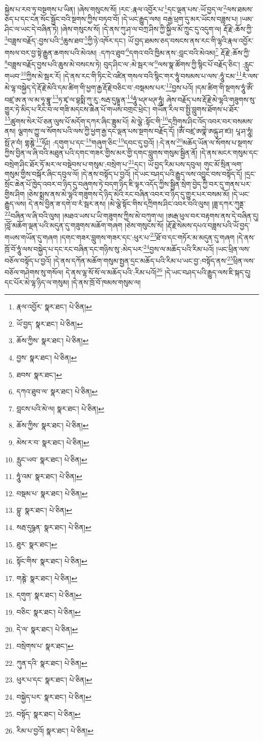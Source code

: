 སྐྱེས་པ་རབ་ཏུ་བསྔགས་པ་ཡིན། །ཞེས་གསུངས་སོ། །རང་:རྣལ་འབྱོར་པ་\footnote{རྣལ་འབྱོར་  སྣར་ཐང་།  པེ་ཅིན། }དང་ལྡན་པས་:ཡོ་བྱད་ལ་\footnote{ཡོ་བྱད་  སྣར་ཐང་།  པེ་ཅིན། }ལས་ཐམས་ཅད་པ་དང་ངན་སོང་སྦྱོང་བའི་སྔགས་ཀྱིས་བཏབ་བོ། །དེ་ཡང་རྒྱུད་ལས། བརྒྱ་ཕྲག་དུ་མར་ཡོངས་བཟླས་པ། །ཡམ་ཤིང་ལ་ཡང་དེ་བཞིན་ཏེ། །ཞེས་གསུངས་སོ། །དེ་ནས་ཀུ་ཤ་ལ་བཀྲ་ཤིས་ཀྱི་སྐྱིལ་མོ་ཀྲུང་དུ་འདུག་ལ། རྡོ་རྗེ་:ཆོས་ཀྱི་\footnote{ཆོས་ཀྱིས་  སྣར་ཐང་།  པེ་ཅིན། }བཟླས་བརྗོད་:བྱས་པའི་\footnote{བྱས་  སྣར་ཐང་།  པེ་ཅིན། }ཆུས་ཐབ་\footnote{ཐབས་  སྣར་ཐང་། }ཀྱི་ཉེ་འཁོར་དང་། ཡོ་བྱད་ཐམས་ཅད་བསངས་ནས་རང་གི་ལྷའི་རྣལ་འབྱོར་གསལ་བར་བྱ་སྟེ་རྒྱུན་ཆགས་པའི་མེའམ། :དཀའ་ཐུབ་\footnote{དཀའ་ཐུབ་ལ་  སྣར་ཐང་།  པེ་ཅིན། }དགའ་བའི་ཁྱིམ་ནས་:བླང་བའི་མེའམ།\footnote{བླངས་པའི་མེ་ལ།  སྣར་ཐང་།  པེ་ཅིན། } རྡོ་རྗེ་:ཆོས་ཀྱི་\footnote{ཆོས་ཀྱིས་  སྣར་ཐང་།  པེ་ཅིན། }བཟླས་བརྗོད་བྱས་པའི་ཆུས་མེ་བསངས་ཏེ། བུད་ཤིང་ལ་:མེ་སྦར་ལ་\footnote{མེས་ར་བ་  སྣར་ཐང་།  པེ་ཅིན། }ལས་སྣ་ཚོགས་ཀྱི་སྙིང་པོ་བརྗོད་ཅིང་། :རླུང་གཡབ་\footnote{རླུང་ཡབ་  སྣར་ཐང་།  པེ་ཅིན། }ཀྱིས་མེ་སྦར་རོ། །དེ་ནས་རང་གི་ཏིང་ངེ་འཛིན་གསལ་བའི་སྙིང་གར་ཧཱུཾ་བསམས་པ་ལས་:ཧཱུཾ་ངམ་\footnote{ཧཱུཾ་འམ་  སྣར་ཐང་།  པེ་ཅིན། }རཾ་ལས་མེ་ལྷ་བསྐྱེད་དེ་རྡོ་རྗེ་མེའི་དམ་ཚིག་གི་ཕྱག་རྒྱ་རྡོ་རྗེ་བཅིང་བ་:བསྡམས་པར་\footnote{བསྡམ་པ་  སྣར་ཐང་།  པེ་ཅིན། }བྱས་པའོ། །དམ་ཚིག་གི་སྔགས་ཧཱུཾ་ཨོཾ་བཛྲ་ཨ་ན་ལ་མ་ཧཱ་བྷཱུ་\footnote{བྷུ་  སྣར་ཐང་།  པེ་ཅིན། }ཏ་ཛྭ་ལ་བྷསྨི་ཀུ་རུ་:སརྦ་དུཥྚཱ་ན་\footnote{སརྦ་དུཥྚན་  སྣར་ཐང་།  པེ་ཅིན། }ཧཱུཾ་ཕཊ་ཕཊ་ཧཱུཾ། ཞེས་བརྗོད་པས་རྡོ་རྗེ་མེ་ལྷའི་གཟུགས་སུ་གྱུར་ཏེ་མིད་པ་རིང་བ་ལ་གཟི་མདངས་ཆེན་པོ་གཡས་བགྲང་ཕྲེང་། གཡོན་རིལ་བ་སྤྱི་བླུགས་ཐོགས་པ་ཐོར་\footnote{ཐུར་  སྣར་ཐང་། }ཚུགས་སེར་པོ་ཅན་ལུས་པོ་མདོག་དཀར་ཞིང་ཟླུམ་པོ། མེ་ལྕེ་:སྟོང་གི་\footnote{སྟོང་གིས་  སྣར་ཐང་།  པེ་ཅིན། }དཀྲིགས་ཤིང་འོད་འབར་བར་བསམས་ནས། ལྕགས་ཀྱུ་ལ་སོགས་པའི་ལས་ཀྱི་ཕྱག་རྒྱ་དང་ལྡན་པས་སྔགས་བརྗོད་དོ། །ཨོཾ་བཛྲ་ཨགྣེ་ཨངྐུ་ཤ་ཛཿ། པཱ་ཤ་ཧཱུཾ། སྥོ་ཊ་བཾ། གྷཎྚེ་\footnote{གཎྚེ་  སྣར་ཐང་།  པེ་ཅིན། }ཧོཿ། :དགུག་པ་དང་\footnote{དགུག་  སྣར་ཐང་།  པེ་ཅིན། }གཞུག་ཅིང་\footnote{བཅིང་  སྣར་ཐང་།  པེ་ཅིན། }དབང་དུ་བྱའོ། །:དེ་ནས་\footnote{དེ་ལ་  སྣར་ཐང་།  པེ་ཅིན། }མཆོད་ཡོན་ལ་སོགས་པ་སྔགས་ཀྱིས་བྱིན་ལ་ཞི་བའི་མཐུན་པའི་དགང་གཟར་གྱིས་མར་གྱི་དགང་བླུགས་གསུམ་སྦྱིན་ནོ། །དེ་ནས་མངར་གསུམ་དང་བསྲེག་ཤིང་ཐོར་ཏོ་མར་ལ་བསྡེབས་པ་གསུམ་:བསྲེག་པ་\footnote{བསྲེགས་པ་  སྣར་ཐང་། }དང་། ཡོ་བྱད་རིམ་པས་དབུལ། གུང་མོ་སྲིན་ལག་གསུམ་གྱིས་བསྐོར་ཞིང་དབུལ་ལོ། །དེ་ནས་བསྟོད་པ་བྱའོ། །དེ་ཡང་བཤད་པའི་རྒྱུད་ལས་འབྱུང་བས་བསྟོད་དོ། །དྲང་སྲོང་ཆེན་པོ་ཁྱེད་འབར་བ་ཉིད་དུ་བཞུགས་ཏེ་བདག་ཉིད་ཇི་ལྟར་འདོད་ཀྱིས་སྦྱིན་སྲེག་བྱེད་ཀྱི་བར་དུ་གནས་པར་གྱིས་ཤིག །ཅེས་སྨྲས་ནས་མེ་ལྷའི་གཟུགས་དེ་ཉིད་མེའི་རང་བཞིན་འབར་བ་ཉིད་དུ་གྱུར་པར་བསམ་མོ། །དེ་ཡང་རྒྱུད་ལས། དེ་ནས་བྱིན་ཟ་དགེ་བ་རཾ་སྦར་ནས། །མེ་ལྕེ་སྟོང་གིས་དཀྲིགས་ཤིང་འབར་བའི་ལུས། །ཟླ་དཀར་ཀུནྡ་\footnote{ཀུན་དའི་  སྣར་ཐང་།  པེ་ཅིན། }བཞིན་ལ་ཞི་བའི་ལུས། །མཐའ་ཡས་པ་ཡི་གཟུགས་ཀྱིས་མེ་བཀུག་ལ། །ཨརྒ་ཕུལ་བར་བརྟགས་ནས་དེ་བཞིན་དུ། །བློ་མཆོག་ལྡན་པའི་མདུན་དུ་གཟུགས་མཆོག་གཞག །ཅེས་གསུངས་སོ། །རྡོ་རྗེ་སེམས་དཔའ་བཟླས་པའི་ཡོ་བྱད་གཡས་གཡོན་དུ་གཞག །དགང་གཟར་བླུགས་གཟར་དང་:ཕུར་པ་\footnote{ཕུར་པ་དང་  སྣར་ཐང་།  པེ་ཅིན། }ཐོ་བ་དང་གཏོར་མ་མདུན་དུ་གཞག །དེ་ནས་ཁྲོ་བོ་ཧཱུཾ་ལས་བསྐྱེད་པ་དང་རང་བཞིན་དང་གཉིས་སུ་:མེད་པར་\footnote{བསྐྱེད་པར་  སྣར་ཐང་།  པེ་ཅིན། }བྱས་ལ་མཆོད་པའི་རིམ་པའོ། །ཡང་ཕྲིན་ལས་བཅོལ་བསྟོད་པ་བྱའོ། །དེ་ནས་དཀོན་མཆོག་གསུམ་སྤྱན་དྲང་མཆོད་པའི་རིམ་པ་ཡང་བྱ་:བསྟོད་ནས་\footnote{བསྟོད་  སྣར་ཐང་།  པེ་ཅིན། }ཕྲིན་ལས་བཅོལ་གཤེགས་སུ་གསོལ། དེ་ནས་ལྷ་སོ་སོ་ལ་མཆོད་པའི་:རིམ་པའོ།\footnote{རིམ་པ་བྱའོ།  སྣར་ཐང་།  པེ་ཅིན། } །དེ་ཡང་བཤད་པའི་རྒྱུད་ལས་ཇི་སྐད་དུ། དང་པོར་མེ་ལྷ་ཉིད་ལ་གསུམ། །དེ་ནས་ཁྲོ་བོ་ཁམས་གསུམ་ལ། 